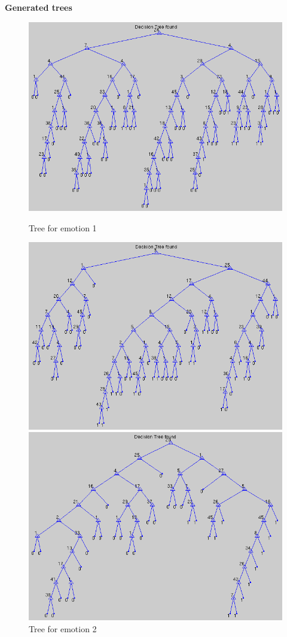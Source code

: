 \documentclass[12pt]{article}
\begin{document}
{\bf Generated trees} \\
\begin{figure}[h]
  \includegraphics{report-images/tree1.png}
  \caption{Tree for emotion 1}
\hfill
  \includegraphics{report-images/tree2.png}
  \caption{Tree for emotion 2}
\hfill
  \includegraphics{report-images/tree3.png}

\end{figure}
\end{document}
